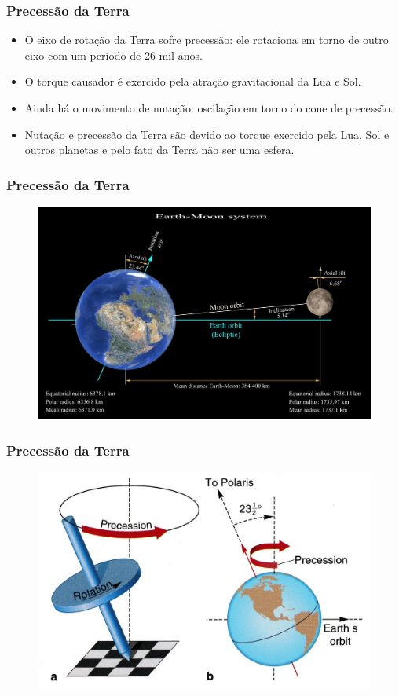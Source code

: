 \documentclass{beamer}
\begin{document}
\begin{frame}
\frametitle{Precessão da Terra}
\begin{itemize}
\item O eixo de rotação da Terra sofre precessão: ele rotaciona em torno de outro eixo com um período de 26 mil anos.
\item O torque causador é exercido pela atração gravitacional da Lua e Sol.
\pause
\item Ainda há o movimento de nutação: oscilação em torno do cone de precessão.
\item Nutação e precessão da Terra são devido ao torque exercido pela Lua, Sol e outros planetas e pelo fato da Terra não ser uma esfera.
\end{itemize}
\end{frame}

\begin{frame}
\frametitle{Precessão da Terra}
\begin{figure}
\includegraphics[width=4.0 in]{figuras/earth_moon_system.jpg}
\end{figure}
\end{frame}


\begin{frame}
\frametitle{Precessão da Terra}
\begin{figure}
\includegraphics[width=3.9 in]{figuras/precession1a.jpg}
\end{figure}
\end{frame}
\end{document}
